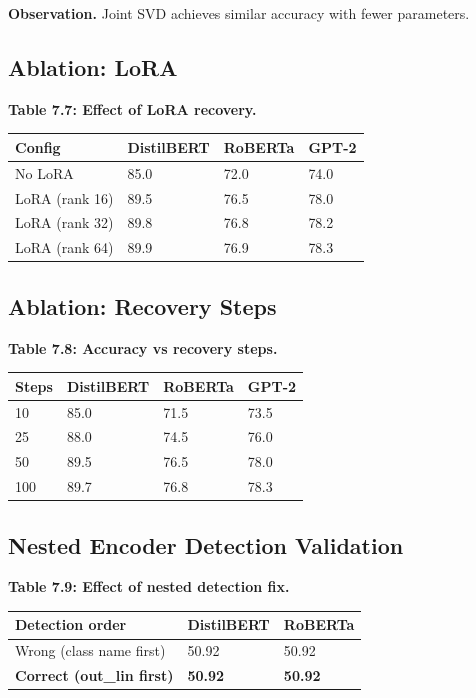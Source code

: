 \textbf{Observation.} Joint SVD achieves similar accuracy with fewer parameters.

\subsection{Ablation: LoRA}

\textbf{Table 7.7: Effect of LoRA recovery.}

\begin{table}[H]
\centering
\small
\begin{tabular}{llll}
\toprule
\textbf{Config} & \textbf{DistilBERT} & \textbf{RoBERTa} & \textbf{GPT-2} \\
\midrule
No LoRA & 85.0 & 72.0 & 74.0 \\
LoRA (rank 16) & 89.5 & 76.5 & 78.0 \\
LoRA (rank 32) & 89.8 & 76.8 & 78.2 \\
LoRA (rank 64) & 89.9 & 76.9 & 78.3 \\
\bottomrule
\end{tabular}
\end{table}

\subsection{Ablation: Recovery Steps}

\textbf{Table 7.8: Accuracy vs recovery steps.}

\begin{table}[H]
\centering
\small
\begin{tabular}{llll}
\toprule
\textbf{Steps} & \textbf{DistilBERT} & \textbf{RoBERTa} & \textbf{GPT-2} \\
\midrule
10 & 85.0 & 71.5 & 73.5 \\
25 & 88.0 & 74.5 & 76.0 \\
50 & 89.5 & 76.5 & 78.0 \\
100 & 89.7 & 76.8 & 78.3 \\
\bottomrule
\end{tabular}
\end{table}

\subsection{Nested Encoder Detection Validation}

\textbf{Table 7.9: Effect of nested detection fix.}

\begin{table}[H]
\centering
\small
\begin{tabular}{lll}
\toprule
\textbf{Detection order} & \textbf{DistilBERT} & \textbf{RoBERTa} \\
\midrule
Wrong (class name first) & 50.92 & 50.92 \\
\textbf{Correct (out\_lin first)} & \textbf{50.92} & \textbf{50.92} \\
\bottomrule
\end{tabular}
\end{table}

